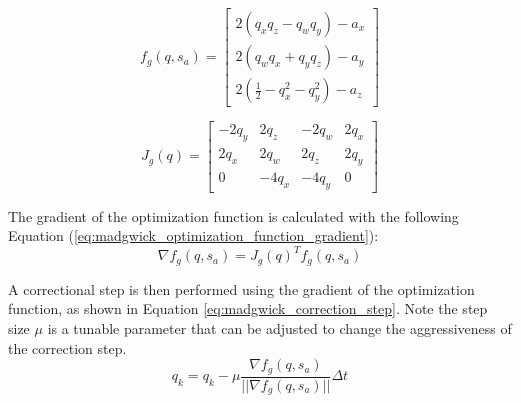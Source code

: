 \documentclass[bare_jrnl_transmag]{subfiles}
\begin{document}
\begin{equation}
f_g(q, s_a) =
\begin{bmatrix}
    2(q_x q_z - q_w q_y) - a_x \\
    2(q_w q_x + q_y q_z) - a_y \\
    2\left(\frac{1}{2} - q_x^2 - q_y^2\right) - a_z
    \end{bmatrix}
    \label{eq:madgwick_optimization_function}
\end{equation}
    
\begin{equation}
    J_g(q) =
    \begin{bmatrix}
    -2q_y & 2q_z & -2q_w & 2q_x \\
    2q_x & 2q_w & 2q_z & 2q_y \\
    0 & -4q_x & -4q_y & 0
\end{bmatrix}
    \label{eq:madgwick_optimization_function_jacobian}
\end{equation}

The gradient of the optimization function is calculated with the following Equation (\ref{eq:madgwick_optimization_function_gradient}):
\begin{equation}
    \nabla f_g(q, s_a) = J_g(q)^T f_g(q, s_a)
    \label{eq:madgwick_optimization_function_gradient}
\end{equation}

A correctional step is then performed using the gradient of the optimization function, as shown in Equation \ref{eq:madgwick_correction_step}. Note the step size $\mu$ is a tunable parameter that can be adjusted to change the aggressiveness of the correction step.
\begin{equation}
    q_{k} = q_{k} - \mu \frac{\nabla f_g(q, s_a)}{||\nabla f_g(q, s_a)||}\Delta t
    \label{eq:madgwick_correction_step}
\end{equation}
\end{document}

